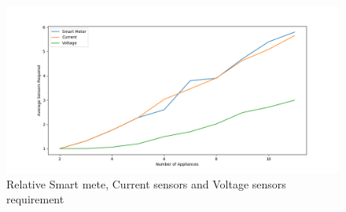 \begin{figure} 
	\centering
	\includegraphics[width=1\linewidth]{images/sensreq}
	\caption[Relative Smart mete, Current sensors and Voltage sensors requirement]{Relative Smart mete, Current sensors and Voltage sensors requirement}
	\label{fig:sensreq}
	\vspace*{-3ex}
\end{figure}
